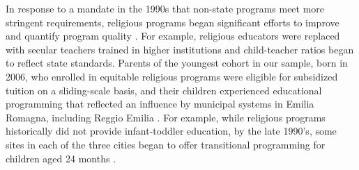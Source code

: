 
In response to a mandate in the 1990s that non-state programs meet more stringent requirements, religious programs began significant efforts to improve and quantify program quality \citep{Malizia-Cicatelli_2011_BOOK_Catholic-School}. For example, religious educators were replaced with secular teachers trained in higher institutions and child-teacher ratios began to reflect state standards. Parents of the youngest cohort in our sample, born in 2006, who enrolled in equitable religious programs were eligible for subsidized tuition on a sliding-scale basis, and their children experienced educational programming that reflected an influence by municipal systems in Emilia Romagna, including Reggio Emilia \citep{Hohnerlein_2009_Paradox-Public-Preschools,OECD_2001_Italy-Country-Note}. For example, while religious programs historically did not provide infant-toddler education, by the late 1990's, some sites in each of the three cities began to offer transitional programming for children aged 24 months \citep{Malizia-Cicatelli_2011_BOOK_Catholic-School,CEHD_2016_Historical-Analysis}. 



